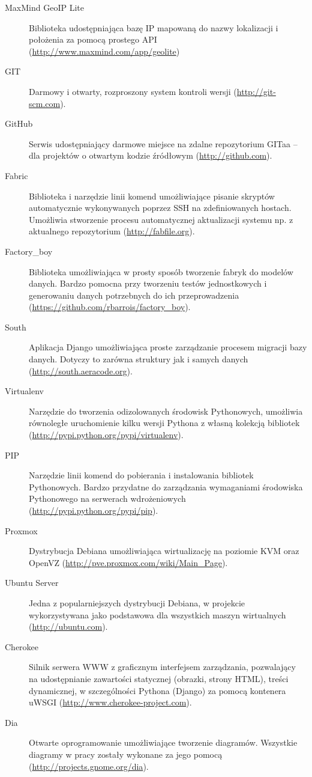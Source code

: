 \begin{description}
    \item[MaxMind GeoIP Lite] Biblioteka udostępniająca bazę IP mapowaną do nazwy lokalizacji i położenia za pomocą prostego API  (\url{http://www.maxmind.com/app/geolite})
    \item[GIT] Darmowy i otwarty, rozproszony system kontroli wersji (\url{http://git-scm.com}).
    \item[GitHub] Serwis udostępniający darmowe miejsce na zdalne repozytorium GITaa -- dla projektów o otwartym kodzie źródłowym (\url{http://github.com}).
    \item[Fabric] Biblioteka i narzędzie linii komend umożliwiające pisanie skryptów automatycznie wykonywanych poprzez SSH na zdefiniowanych hostach. Umożliwia stworzenie procesu automatycznej aktualizacji systemu np. z aktualnego repozytorium (\url{http://fabfile.org}).
    \item[Factory\_boy] Biblioteka umożliwiająca w prosty sposób tworzenie fabryk do modelów danych. Bardzo pomocna przy tworzeniu testów jednostkowych i generowaniu danych potrzebnych do ich przeprowadzenia (\url{https://github.com/rbarrois/factory\_boy}).
    \item[South] Aplikacja Django umożliwiająca proste zarządzanie procesem migracji bazy danych. Dotyczy to zarówna struktury jak i samych danych (\url{http://south.aeracode.org}).
    \item[Virtualenv] Narzędzie do tworzenia odizolowanych środowisk Pythonowych, umożliwia równoległe uruchomienie kilku wersji Pythona z własną kolekcją bibliotek (\url{http://pypi.python.org/pypi/virtualenv}).
    \item[PIP] Narzędzie linii komend do pobierania i instalowania bibliotek Pythonowych. Bardzo przydatne do zarządzania wymaganiami środowiska Pythonowego na serwerach wdrożeniowych (\url{http://pypi.python.org/pypi/pip}).
    \item[Proxmox] Dystrybucja Debiana umożliwiająca wirtualizację na poziomie KVM oraz OpenVZ (\url{http://pve.proxmox.com/wiki/Main_Page}).
    \item[Ubuntu Server] Jedna z popularniejszych dystrybucji Debiana, w projekcie wykorzystywana jako podstawowa dla wszystkich maszyn wirtualnych (\url{http://ubuntu.com}).
    \item[Cherokee] Silnik serwera WWW z graficznym interfejsem zarządzania, pozwalający na udostępnianie zawartości statycznej (obrazki, strony HTML), treści dynamicznej, w szczególności Pythona (Django) za pomocą kontenera uWSGI (\url{http://www.cherokee-project.com}).
    \item[Dia] Otwarte oprogramowanie umożliwiające tworzenie diagramów. Wszystkie diagramy w pracy zostały wykonane za jego pomocą (\url{http://projects.gnome.org/dia}).
\end{description}

\newpage
